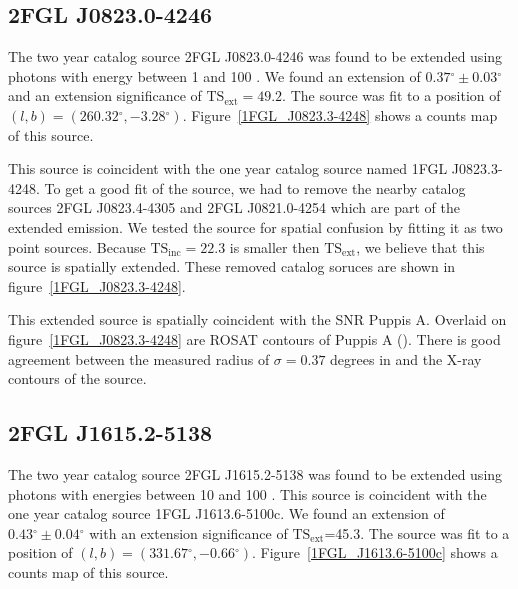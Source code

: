 \documentclass[12pt,preprint]{aastex}
\newcommand{\gev}{\text{GeV}\xspace}
\newcommand{\tsext}{{\ensuremath{\text{TS}_\text{ext}}}\xspace}
\newcommand{\tsinc}{\ensuremath{\text{TS}_\text{inc}}\xspace}
\renewcommand{\deg}{\ensuremath{^\circ}\xspace}
\begin{document}
\subsection{2FGL J0823.0-4246}
\label{section_puppis_a}


The two year catalog source 2FGL J0823.0-4246 was found to be
extended using photons with energy between 1 \gev and 100 \gev.
We found an extension of $0.37\deg\pm0.03\deg$ and an extension
significance of $\tsext=49.2$.  The source was fit to a position of
$(l,b)=(260.32\deg,-3.28\deg)$.  Figure~\ref{1FGL_J0823.3-4248} shows
a counts map of this source.

This source is coincident with the one year catalog source named 1FGL
J0823.3-4248.  To get a good fit of the source, we had to remove the
nearby catalog sources 2FGL J0823.4-4305 and 2FGL J0821.0-4254 which
are part of the extended emission.  We tested the source for spatial
confusion by fitting it as two point sources. Because $\tsinc=22.3$ is
smaller then \tsext, we believe that this source is spatially extended.
These removed catalog soruces are shown in figure~\ref{1FGL_J0823.3-4248}.

This extended source is spatially coincident with the SNR Puppis A.
Overlaid on figure~\ref{1FGL_J0823.3-4248} are ROSAT contours of
Puppis A (\cite{rosat_puppis_a}). There is good agreement
between the measured radius of $\sigma=0.37$ degrees in \gev and 
the X-ray contours of the source.


\subsection{2FGL J1615.2-5138}


The two year catalog source 2FGL J1615.2-5138 was found to be extended
using photons with energies between 10 \gev and 100 \gev.  This source
is coincident with the one year catalog source 1FGL J1613.6-5100c.
We found an extension of $0.43\deg\pm0.04\deg$ with an extension
significance of \tsext=45.3.  The source was fit to a position of
$(l,b)=(331.67\deg,-0.66\deg)$.  Figure~\ref{1FGL_J1613.6-5100c} shows
a counts map of this source.
\end{document}
